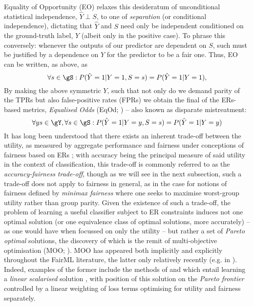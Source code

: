 %
%
Equality of Opportunity (EO) relaxes this desideratum of unconditional statistical independence,
\(\hat{Y} \perp S\), to one of \emph{separation} (or conditional independence), dictating that
\(\hat{Y}\) and \(S\) need only be independent conditioned on the ground-truth label, \(Y\) (albeit
only in the positive case).
%
To phrase this conversely: whenever the outputs of our predictor are dependent on \(S\), such must be
justified by a dependence on \(Y\) for the predictor to be a fair one.
%
Thus, EO can be written, as above, as
%
\begin{equation}
    \forall s \in \gS: P( \hat{Y}=1|Y=1, S=s ) = P(\hat{Y}=1|Y=1),
\end{equation}
%
%
By making the above symmetric \wrt{} \(Y\), such that not only do we demand parity of the TPRs but
also false-positive rates (FPRs) we obtain the final of the ERs-based metrics, \emph{Equalised
Odds} (EqOd; \cite{hardt2016equality}) -- also known as disparate mistreatment:
%
\begin{equation}
    \forall y s \in \gY, \forall s \in \gS: P( \hat{Y}=1|Y=y, S=s ) = P( \hat{Y}=1|Y=y )
\end{equation}
%
%
It has long been understood that there exists an inherent trade-off between the utility, as
measured by aggregate performance and fairness under conceptions of fairness based on ERs
\citep{kaplow1999conflict}; with accuracy being the principal measure of said utility in the
context of classification, this trade-off is commonly referred to as the \emph{accuracy-fairness
trade-off}, though as we will see in the next subsection, such a trade-off does not apply to
fairness in general, as in the case for notions of fairness defined by \emph{minimax fairness}
where one seeks to maximise worst-group utility rather than group parity.
%
Given the existence of such a trade-off, the problem of learning a useful classifier subject to ER
constraints induces not one optimal solution (or one equivalence class of optimal solutions, more
accurately) -- as one would have when focussed on only the utility -- but rather a set of
\emph{Pareto optimal} solutions, the discovery of which is the remit of multi-objective
optimisation (MOO; \cite{sawaragi1985theory, deb2013multi}). 
%
MOO has appeared both implicitly and explicitly throughout the FairML literature, the latter only
relatively recently (e.g. in \cite{navon2020learning}). 
%
Indeed, examples of the former include the methods of \cite{louizos2015variational} and
\cite{madras2018learning} which entail learning a \emph{linear scalarised} solution
\citep{boyd2004convex},  with position of this solution on the \emph{Pareto frontier} controlled by
a linear weighting of loss terms optimising for utility and fairness separately.
%
